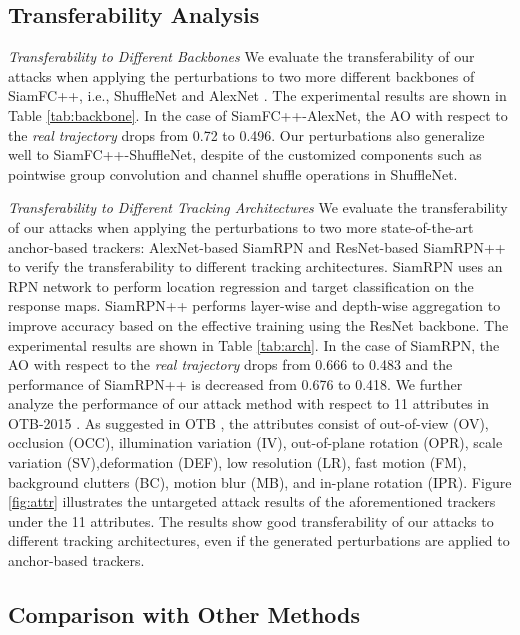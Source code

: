 \documentclass[journal]{IEEEtran}
\newcommand{\ie}{i.e.}
\begin{document}
\subsection{Transferability Analysis}

\textit{Transferability to Different Backbones} We evaluate the transferability of our attacks when applying the perturbations to two more different backbones of SiamFC++, \ie, ShuffleNet \cite{ShuffleNet} and AlexNet \cite{AlexNet}.
The experimental results are shown in Table \ref{tab:backbone}. In the case of SiamFC++-AlexNet, the AO with respect to the \textit{real trajectory} drops from 0.72 to 0.496. Our perturbations also generalize well to SiamFC++-ShuffleNet, despite of the customized components such as pointwise group convolution and channel shuffle operations in ShuffleNet.

\textit{Transferability to Different Tracking Architectures} We evaluate the transferability of our attacks when applying the perturbations to two more state-of-the-art anchor-based trackers: AlexNet-based SiamRPN \cite{SiamRPN} and ResNet-based SiamRPN++ \cite{SiamRPN++} to verify the transferability to different tracking architectures.
SiamRPN uses an RPN network to perform location regression and target classification on the response maps. SiamRPN++ performs layer-wise and depth-wise aggregation to improve accuracy based on the effective training using the ResNet backbone. The experimental results are shown in Table \ref{tab:arch}. In the case of SiamRPN, the AO with respect to the \textit{real trajectory} drops from 0.666 to 0.483 and the performance of SiamRPN++ is decreased from 0.676 to 0.418. We further analyze the performance of our attack method with respect to 11 attributes in OTB-2015 \cite{OTB}. As suggested in OTB \cite{OTB}, the attributes consist of out-of-view (OV), occlusion (OCC), illumination variation (IV), out-of-plane rotation (OPR), scale variation (SV),deformation (DEF), low resolution (LR), fast motion (FM), background clutters (BC), motion blur (MB), and in-plane rotation (IPR). Figure \ref{fig:attr} illustrates the untargeted attack results of the aforementioned trackers under the 11 attributes. The results show good transferability of our attacks to different tracking architectures, even if the generated perturbations are applied to anchor-based trackers.

\subsection{Comparison with Other Methods}
\end{document}

